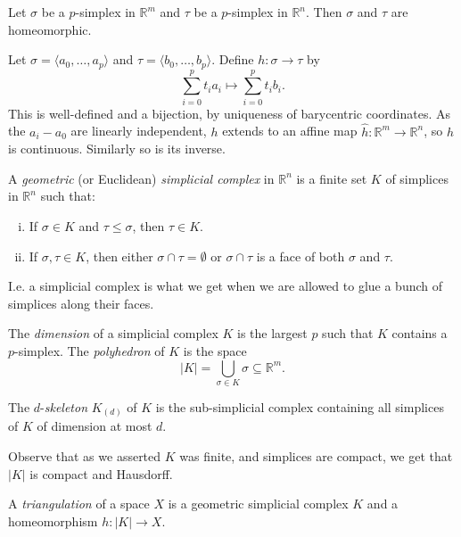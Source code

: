 \documentclass[12pt]{article}
\begin{document}
\begin{lemma}
	Let $\sigma$ be a $p$-simplex in $\mathbb{R}^m$ and $\tau$ be a $p$-simplex in $\mathbb{R}^n$. Then $\sigma$ and $\tau$ are homeomorphic.
\end{lemma}

\begin{proofbox}
	Let $\sigma = \langle a_0, \ldots, a_p \rangle$ and $\tau = \langle b_0, \ldots, b_p \rangle$. Define $h : \sigma \to \tau$ by
	\[
	\sum_{i = 0}^p t_i a_i \mapsto \sum_{i = 0}^p t_i b_i.
	\]
	This is well-defined and a bijection, by uniqueness of barycentric coordinates. As the $a_i - a_0$ are linearly independent, $h$ extends to an affine map $\hat h : \mathbb{R}^m \to \mathbb{R}^n$, so $h$ is continuous. Similarly so is its inverse.
\end{proofbox}

\begin{definition}
	A \emph{geometric} (or Euclidean) \emph{simplicial complex} in $\mathbb{R}^n$ is a finite set $K$ of simplices in $\mathbb{R}^n$ such that:
	\begin{enumerate}[(i)]
		\item If $\sigma \in K$ and $\tau \leq \sigma$, then $\tau \in K$.
		\item If $\sigma, \tau \in K$, then either $\sigma \cap \tau = \emptyset$ or $\sigma \cap \tau$ is a face of both $\sigma$ and $\tau$.
	\end{enumerate}
\end{definition}

I.e. a simplicial complex is what we get when we are allowed to glue a bunch of simplices along their faces.

The \emph{dimension} of a simplicial complex $K$ is the largest $p$ such that $K$ contains a $p$-simplex. The \emph{polyhedron} of $K$ is the space
\[
|K| = \bigcup_{\sigma \in K}\sigma \subseteq \mathbb{R}^m.
\]

The $d$-\emph{skeleton} $K_{(d)}$ of $K$ is the sub-simplicial complex containing all simplices of $K$ of dimension at most $d$.

Observe that as we asserted $K$ was finite, and simplices are compact, we get that $|K|$ is compact and Hausdorff.

\begin{definition}
	A \emph{triangulation} of a space $X$ is a geometric simplicial complex $K$ and a homeomorphism $h : |K| \to X$.
\end{definition}
\end{document}
